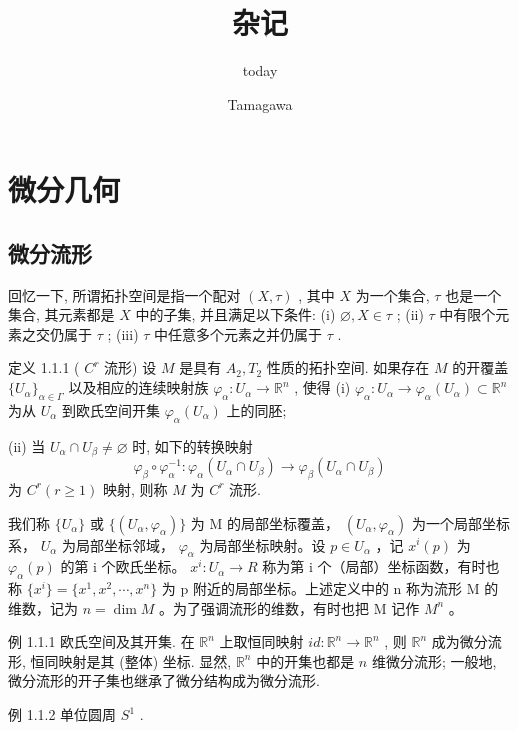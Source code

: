 \documentclass[]{article}
\title{杂记}
\author{today}
\author{Tamagawa}
\begin{document}
	
\maketitle

\section{微分几何}

\subsection{微分流形}

回忆一下, 所谓拓扑空间是指一个配对 $(X, \tau)$ , 其中 $X$ 为一个集合, $\tau$ 也是一个集合, 其元素都是 $X$ 中的子集, 并且满足以下条件: (i) $\varnothing, X \in \tau$ ; (ii) $\tau$ 中有限个元素之交仍属于 $\tau$ ; (iii) $\tau$ 中任意多个元素之并仍属于 $\tau$ . 

定义 1.1.1 ( $C^r$ 流形) 设 $M$ 是具有 $A_2, T_2$ 性质的拓扑空间. 如果存在 $M$ 的开覆盖 $\{U_\alpha\}_{\alpha \in \Gamma}$ 以及相应的连续映射族 $\varphi_\alpha: U_\alpha \to \mathbb{R}^n$ , 使得 (i) $\varphi_{\alpha}: U_{\alpha} \to \varphi_{\alpha}(U_{\alpha}) \subset \mathbb{R}^{n}$ 为从 $U_{\alpha}$ 到欧氏空间开集 $\varphi_{\alpha}(U_{\alpha})$ 上的同胚; 

(ii) 当 $U_{\alpha} \cap U_{\beta} \neq \varnothing$ 时, 如下的转换映射 $$
\varphi_ {\beta} \circ \varphi_ {\alpha} ^ {- 1}: \varphi_ {\alpha} (U _ {\alpha} \cap U _ {\beta}) \rightarrow \varphi_ {\beta} (U _ {\alpha} \cap U _ {\beta})
$$为 $C^r (r\geqslant 1)$ 映射, 则称 $M$ 为 $C^r$ 流形. 

我们称 $\{U_{\alpha}\}$ 或 $\{(U_{\alpha},\varphi_{\alpha})\}$ 为 M 的局部坐标覆盖， $(U_{\alpha},\varphi_{\alpha})$ 为一个局部坐标系， $U_{\alpha}$ 为局部坐标邻域， $\varphi_{\alpha}$ 为局部坐标映射。设 $p\in U_{\alpha}$ ，记 $x^{i}(p)$ 为 $\varphi_{\alpha}(p)$ 的第 i 个欧氏坐标。 $x^{i}:U_{\alpha}\to R$ 称为第 i 个（局部）坐标函数，有时也称 $\{x^{i}\}=\{x^{1},x^{2},\cdots,x^{n}\}$ 为 p 附近的局部坐标。上述定义中的 n 称为流形 M 的维数，记为 $n=\dim M$ 。为了强调流形的维数，有时也把 M 记作 $M^{n}$ 。 

例 1.1.1 欧氏空间及其开集. 在 $\mathbb{R}^n$ 上取恒同映射 $id: \mathbb{R}^n \to \mathbb{R}^n$ , 则 $\mathbb{R}^n$ 成为微分流形, 恒同映射是其 (整体) 坐标. 显然, $\mathbb{R}^n$ 中的开集也都是 $n$ 维微分流形; 一般地, 微分流形的开子集也继承了微分结构成为微分流形. 

例 1.1.2 单位圆周 $S^{1}$ . 
\end{document}
